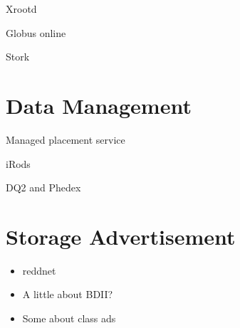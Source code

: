 Xrootd



Globus online

Stork

\section{Data Management}

Managed placement service

iRods 

DQ2 and Phedex

\section{Storage Advertisement}

\begin{itemize}
\item reddnet
\item A little about BDII?
\item Some about class ads
\end{itemize}




